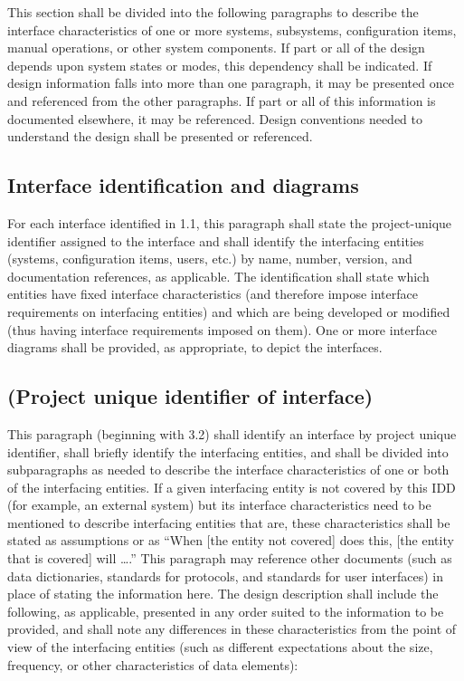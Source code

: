 \documentclass{fidata-report-template}
\begin{document}
This section shall be divided into the following paragraphs to describe
the interface characteristics of one or more systems, subsystems,
configuration items, manual operations, or other system components. If
part or all of the design depends upon system states or modes, this
dependency shall be indicated. If design information falls into more
than one paragraph, it may be presented once and referenced from the
other paragraphs. If part or all of this information is documented
elsewhere, it may be referenced. Design conventions needed to understand
the design shall be presented or referenced.

\subsection{Interface identification and diagrams}

For each interface identified in 1.1, this paragraph shall state the
project-unique identifier assigned to the interface and shall identify
the interfacing entities (systems, configuration items, users, etc.) by
name, number, version, and documentation references, as applicable. The
identification shall state which entities have fixed interface
characteristics (and therefore impose interface requirements on
interfacing entities) and which are being developed or modified (thus
having interface requirements imposed on them). One or more interface
diagrams shall be provided, as appropriate, to depict the interfaces.

\subsection{(Project unique identifier of interface)}

This paragraph (beginning with 3.2) shall identify an interface by
project unique identifier, shall briefly identify the interfacing
entities, and shall be divided into subparagraphs as needed to describe
the interface characteristics of one or both of the interfacing
entities. If a given interfacing entity is not covered by this IDD (for
example, an external system) but its interface characteristics need to
be mentioned to describe interfacing entities that are, these
characteristics shall be stated as assumptions or as ``When {[}the
entity not covered{]} does this, {[}the entity that is covered{]} will
\ldots{}.'' This paragraph may reference other documents (such as data
dictionaries, standards for protocols, and standards for user
interfaces) in place of stating the information here. The design
description shall include the following, as applicable, presented in any
order suited to the information to be provided, and shall note any
differences in these characteristics from the point of view of the
interfacing entities (such as different expectations about the size,
frequency, or other characteristics of data elements):
\end{document}
